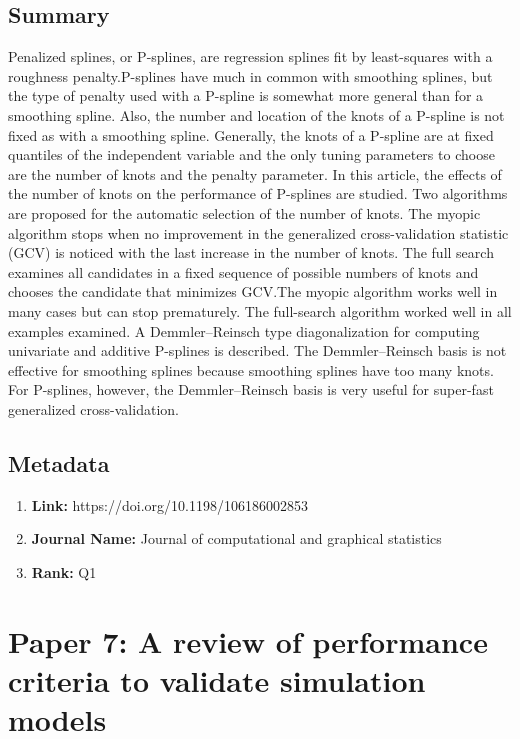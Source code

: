 \documentclass[10pt, oneside]{article}
\begin{document}
\subsection*{Summary}
Penalized splines, or P-splines, are regression splines fit by least-squares with a roughness penalty.P-splines have much in
common with smoothing splines, but the type of penalty used with a P-spline is somewhat more general than for a smoothing spline.
Also, the number and location of the knots of a P-spline is not fixed as with a smoothing spline. Generally, the knots of a
P-spline are at fixed quantiles of the independent variable and the only tuning parameters to choose are the number of knots
and the penalty parameter. In this article, the effects of the number of knots on the performance of P-splines are studied.
Two algorithms are proposed for the automatic selection of the number of knots. The myopic algorithm stops when no improvement
in the generalized cross-validation statistic (GCV) is noticed with the last increase in the number of knots. The full search
examines all candidates in a fixed sequence of possible numbers of knots and chooses the candidate that minimizes GCV.The
myopic algorithm works well in many cases but can stop prematurely. The full-search algorithm worked well in all examples
examined. A Demmler–Reinsch type diagonalization for computing univariate and additive P-splines is described. The
Demmler–Reinsch basis is not effective for smoothing splines because smoothing splines have too many knots. For P-splines,
however, the Demmler–Reinsch basis is very useful for super-fast generalized cross-validation.
\cite{ruppert2002selecting}

\subsection*{Metadata}
\begin{enumerate}
	\item \textbf{Link:} https://doi.org/10.1198/106186002853
	\item \textbf{Journal Name:} Journal of computational and graphical statistics
	\item \textbf{Rank:} Q1
\end{enumerate}

\section*{Paper 7: A review of performance criteria to validate simulation models}
\end{document}
